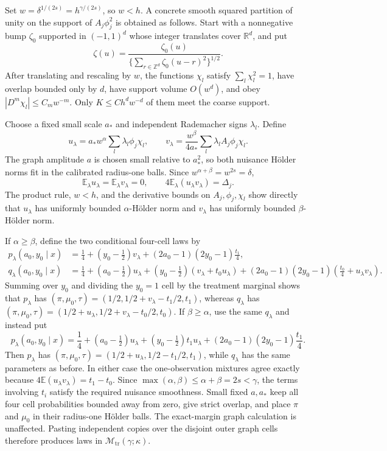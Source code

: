 Set \(w=\delta^{1/(2s)}=h^{\gamma/(2s)}\), so \(w<h\). A concrete smooth squared partition of unity on the support of \(A_j\phi_j^2\) is obtained as follows. Start with a nonnegative bump \(\zeta_0\) supported in \((-1,1)^d\) whose integer translates cover \(\mathbb R^d\), and put
\[
\zeta(u)=\frac{\zeta_0(u)}{\{\sum_{r\in\mathbb Z^d}\zeta_0(u-r)^2\}^{1/2}}.
\]
After translating and rescaling by \(w\), the functions \(\chi_l\) satisfy \(\sum_l\chi_l^2=1\), have overlap bounded only by \(d\), have support volume \(O(w^d)\), and obey \(|D^m\chi_l|\le C_mw^{-m}\). Only \(K\le Ch^dw^{-d}\) of them meet the coarse support.

Choose a fixed small scale \(a_*\) and independent Rademacher signs \(\lambda_l\). Define
\[
u_\lambda=a_*w^\alpha\sum_l\lambda_l\phi_j\chi_l,
\qquad
v_\lambda=\frac{w^\beta}{4a_*}\sum_l\lambda_lA_j\phi_j\chi_l.
\]
The graph amplitude \(a\) is chosen small relative to \(a_*^2\), so both nuisance Hölder norms fit in the calibrated radius-one balls. Since \(w^{\alpha+\beta}=w^{2s}=\delta\),
\[
\mathbb E_\lambda u_\lambda=\mathbb E_\lambda v_\lambda=0,
\qquad
4\mathbb E_\lambda(u_\lambda v_\lambda)=\Delta_j.
\]
The product rule, \(w<h\), and the derivative bounds on \(A_j,\phi_j,\chi_l\) show directly that \(u_\lambda\) has uniformly bounded \(\alpha\)-Hölder norm and \(v_\lambda\) has uniformly bounded \(\beta\)-Hölder norm.

If \(\alpha\ge\beta\), define the two conditional four-cell laws by
\[
\begin{aligned}
p_\lambda(a_0,y_0\mid x)
&=\frac14+(y_0-\tfrac12)v_\lambda+(2a_0-1)(2y_0-1)\frac{t_1}{4},\\
q_\lambda(a_0,y_0\mid x)
&=\frac14+(a_0-\tfrac12)u_\lambda+(y_0-\tfrac12)(v_\lambda+t_0u_\lambda)
 +(2a_0-1)(2y_0-1)\left(\frac{t_0}{4}+u_\lambda v_\lambda\right).
\end{aligned}
\]
Summing over \(y_0\) and dividing the \(y_0=1\) cell by the treatment marginal shows that \(p_\lambda\) has \((\pi,\mu_0,\tau)=(1/2,1/2+v_\lambda-t_1/2,t_1)\), whereas \(q_\lambda\) has \((\pi,\mu_0,\tau)=(1/2+u_\lambda,1/2+v_\lambda-t_0/2,t_0)\). If \(\beta\ge\alpha\), use the same \(q_\lambda\) and instead put
\[
p_\lambda(a_0,y_0\mid x)=\frac14+(a_0-\tfrac12)u_\lambda+(y_0-\tfrac12)t_1u_\lambda+(2a_0-1)(2y_0-1)\frac{t_1}{4}.
\]
Then \(p_\lambda\) has \((\pi,\mu_0,\tau)=(1/2+u_\lambda,1/2-t_1/2,t_1)\), while \(q_\lambda\) has the same parameters as before. In either case the one-observation mixtures agree exactly because \(4\mathbb E(u_\lambda v_\lambda)=t_1-t_0\). Since \(\max(\alpha,\beta)\le\alpha+\beta=2s<\gamma\), the terms involving \(t_i\) satisfy the required nuisance smoothness. Small fixed \(a,a_*\) keep all four cell probabilities bounded away from zero, give strict overlap, and place \(\pi\) and \(\mu_0\) in their radius-one Hölder balls. The exact-margin graph calculation is unaffected. Pasting independent copies over the disjoint outer graph cells therefore produces laws in \(\mathcal M_{\mathrm{tr}}(\gamma;\kappa)\).

